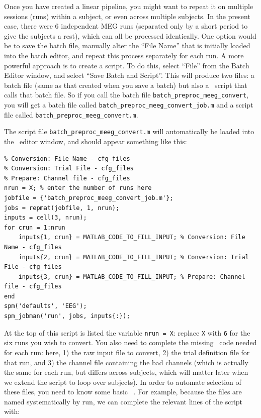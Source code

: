 Once you have created a linear pipeline, you might want to repeat it on multiple sessions (runs) within a subject, or even across multiple subjects. In the present case, there were 6 independent MEG runs (separated only by a short period to give the subjects a rest), which can all be processed identically. One option would be to save the batch file, manually alter the ``File Name'' that is initially loaded into the batch editor, and repeat this process separately for each run. A more powerful approach is to create a script. To do this, select ``File'' from the Batch Editor window, and select ``Save Batch and Script''. This will produce two files: a batch file (same as that created when you save a batch) but also a \matlab\ script that calls that batch file. So if you call the batch file \texttt{batch\_preproc\_meeg\_convert}, you will get a batch file called \texttt{batch\_preproc\_meeg\_convert\_job.m} and a script file called \texttt{batch\_preproc\_meeg\_convert.m}.
 
The script file \texttt{batch\_preproc\_meeg\_convert.m} will automatically be loaded into the \matlab\ editor window, and should appear something like this:


\begin{lstlisting}[style=Matlab-editor,basicstyle=\mlttfamily\footnotesize]
% List of open inputs
% Conversion: File Name - cfg_files
% Conversion: Trial File - cfg_files
% Prepare: Channel file - cfg_files
nrun = X; % enter the number of runs here
jobfile = {'batch_preproc_meeg_convert_job.m'};
jobs = repmat(jobfile, 1, nrun);
inputs = cell(3, nrun);
for crun = 1:nrun
    inputs{1, crun} = MATLAB_CODE_TO_FILL_INPUT; % Conversion: File Name - cfg_files
    inputs{2, crun} = MATLAB_CODE_TO_FILL_INPUT; % Conversion: Trial File - cfg_files
    inputs{3, crun} = MATLAB_CODE_TO_FILL_INPUT; % Prepare: Channel file - cfg_files
end
spm('defaults', 'EEG');
spm_jobman('run', jobs, inputs{:}); 
\end{lstlisting}

At the top of this script is listed the variable \verb|nrun = X|: replace \verb|X| with \verb|6| for the six runs you wish to convert. You also need to complete the missing \matlab\ code needed for each run: here, 1) the raw input file to convert, 2) the trial definition file for that run, and 3) the channel file containing the bad channels (which is actually the same for each run, but differs across subjects, which will matter later when we extend the script to loop over subjects). In order to automate selection of these files, you need to know some basic \matlab\ . For example, because the files are named systematically by run, we can complete the relevant lines of the script with:

